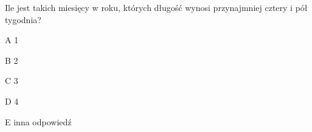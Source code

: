 \begin{tresc}
Ile jest takich miesięcy w roku, których długość wynosi przynajmniej cztery i pół tygodnia?
\end{tresc}
\begin{wariant}{A} 1 \end{wariant}
\begin{wariant}{B} 2 \end{wariant}
\begin{wariant}{C} 3 \end{wariant}
\begin{wariant}{D} 4 \end{wariant}
\begin{wariant}{E} inna odpowiedź \end{wariant}

